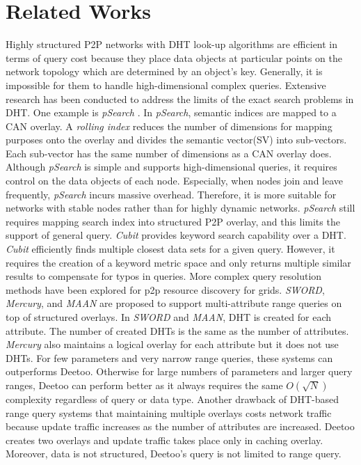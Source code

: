 \documentclass[conference]{IEEEtran}
\begin{document}
\section{Related Works}
\label{sec:related_works}
Highly structured P2P networks with DHT look-up algorithms 
\cite{is:Chord, sr:CAN, bz:Tapestry, pr:Symphony} 
are efficient 
in terms of query cost %
because they place data objects at particular points on the network topology
which are determined by an object's key. 
Generally, it is impossible for them to handle
high-dimensional complex queries.  Extensive research has been conducted 
to address the limits of the exact search problems in DHT.
One example is \emph{pSearch} \cite{psearch}.
In \emph{pSearch}, semantic indices are mapped to a CAN overlay. 
A \emph{rolling index} reduces the number of dimensions for mapping purposes 
onto the overlay and divides the semantic vector(SV) into sub-vectors. 
Each sub-vector has the same number of dimensions as a CAN overlay does.
Although \emph{pSearch} is simple and supports high-dimensional queries, 
it requires control on the data objects of each node. Especially, when 
nodes join and leave frequently, \emph{pSearch} incurs massive overhead.
Therefore, it is more suitable for networks with stable nodes rather than
for highly dynamic networks.
\emph{pSearch} still requires mapping search index into structured P2P overlay, and
this limits the support of general query.
\emph{Cubit}\cite{cubit} provides keyword search capability over a DHT. \emph{Cubit} 
efficiently finds multiple closest data sets for a given query. However, 
it requires the creation of a keyword metric space and only returns multiple 
similar results to compensate for typos in queries. 
More complex query resolution methods have been explored for p2p resource 
discovery for grids. \emph{SWORD}\cite{sword}, 
\emph{Mercury}\cite{mercury}, and \emph{MAAN}\cite{maan} 
are proposed to support multi-attribute 
range queries on top of structured overlays.
In \emph{SWORD} and \emph{MAAN}, DHT is created for each attribute.
The number of created DHTs is the same as the number of attributes.
\emph{Mercury} also maintains a logical overlay for each attribute but
it does not use DHTs. For few parameters and very narrow range queries,
these systems can outperforms Deetoo. 
Otherwise for large numbers of parameters and larger query ranges, 
Deetoo can perform better as it always requires the same $O(\sqrt{N})$
complexity regardless of query or data type.
Another drawback of DHT-based range query systems
that maintaining multiple overlays 
costs network traffic
because update traffic increases as the number of attributes are 
increased. Deetoo creates two overlays and update traffic takes 
place only in caching overlay. Moreover, data is not structured,
Deetoo's query is not limited to range query.  
\end{document}
